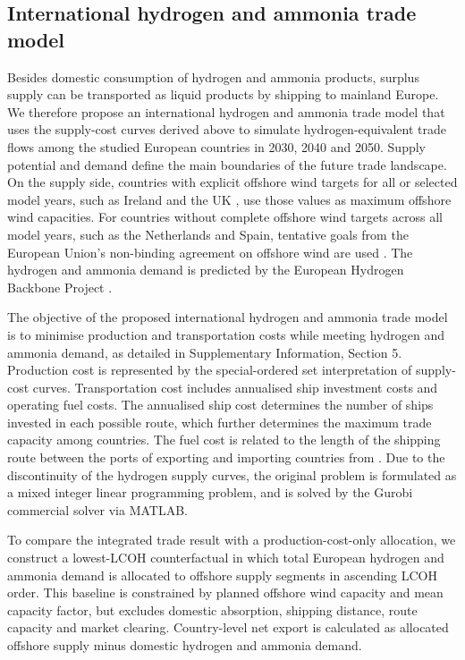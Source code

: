 \documentclass[pdflatex,sn-mathphys,Numbered]{sn-jnl}%
\begin{document}
\subsection{International hydrogen and ammonia trade model}
Besides domestic consumption of hydrogen and ammonia products, surplus supply can be transported as liquid products by shipping to mainland Europe. We therefore propose an international hydrogen and ammonia trade model that uses the supply-cost curves derived above to simulate hydrogen-equivalent trade flows among the studied European countries in 2030, 2040 and 2050. Supply potential and demand define the main boundaries of the future trade landscape. On the supply side, countries with explicit offshore wind targets for all or selected model years, such as Ireland \cite{FutureFrameworkforOffshore} and the UK \cite{Offshorewindnet}, use those values as maximum offshore wind capacities. For countries without complete offshore wind targets across all model years, such as the Netherlands and Spain, tentative goals from the European Union's non-binding agreement on offshore wind are used \cite{Offshorerenewableenergy}.
The hydrogen and ammonia demand is predicted by the European Hydrogen Backbone Project \cite{Analysingfuturedemand}.

The objective of the proposed international hydrogen and ammonia trade model is to minimise production and transportation costs while meeting hydrogen and ammonia demand, as detailed in Supplementary Information, Section 5. Production cost is represented by the special-ordered set interpretation of supply-cost curves. Transportation cost includes annualised ship investment costs and operating fuel costs. The annualised ship cost determines the number of ships invested in each possible route, which further determines the maximum trade capacity among countries.
The fuel cost is related to the length of the shipping route between the ports of exporting and importing countries from \cite{EMODnet}.
Due to the discontinuity of the hydrogen supply curves, the original problem is formulated as a mixed integer linear programming problem, and
is solved by the Gurobi commercial solver via MATLAB.

To compare the integrated trade result with a production-cost-only allocation, we construct a lowest-LCOH counterfactual in which total European hydrogen and ammonia demand is allocated to offshore supply segments in ascending LCOH order. This baseline is constrained by planned offshore wind capacity and mean capacity factor, but excludes domestic absorption, shipping distance, route capacity and market clearing. Country-level net export is calculated as allocated offshore supply minus domestic hydrogen and ammonia demand.
\end{document}
